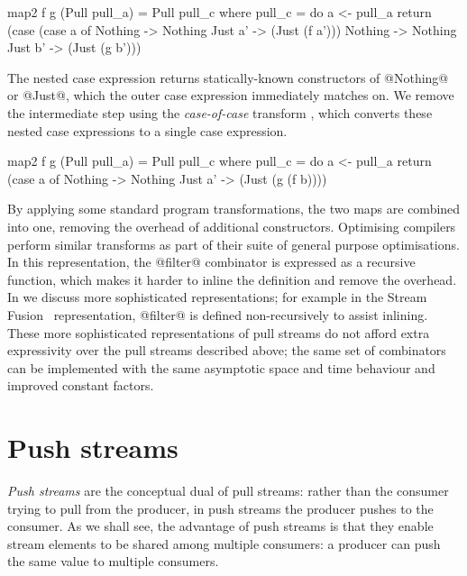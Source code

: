 \begin{haskell}
map2 f g (Pull pull_a) = Pull pull_c
 where
  pull_c = do
    a <- pull_a
    return (case (case a of
                   Nothing -> Nothing
                   Just a' -> (Just (f a')))
             Nothing -> Nothing
             Just b' -> (Just (g b')))
\end{haskell}

The nested case expression returns statically-known constructors of @Nothing@ or @Just@, which the outer case expression immediately matches on.
We remove the intermediate step using the \emph{case-of-case} transform \cite{jones1998transformation}, which converts these nested case expressions to a single case expression.


\begin{haskell}
map2 f g (Pull pull_a) = Pull pull_c
 where
  pull_c = do
    a <- pull_a
    return (case a of
             Nothing -> Nothing
             Just a' -> (Just (g (f b))))
\end{haskell}

By applying some standard program transformations, the two maps are combined into one, removing the overhead of additional constructors.
Optimising compilers perform similar transforms as part of their suite of general purpose optimisations.
In this representation, the @filter@ combinator is expressed as a recursive function, which makes it harder to inline the definition and remove the overhead.
In  we discuss more sophisticated representations; for example in the Stream Fusion~\cite{coutts2007stream} representation, @filter@ is defined non-recursively to assist inlining.
These more sophisticated representations of pull streams do not afford extra expressivity over the pull streams described above; the same set of combinators can be implemented with the same asymptotic space and time behaviour and improved constant factors.



\section{Push streams}
\label{taxonomy/push}

\emph{Push streams} are the conceptual dual of pull streams: rather than the consumer trying to pull from the producer, in push streams the producer pushes to the consumer.
As we shall see, the advantage of push streams is that they enable stream elements to be shared among multiple consumers: a producer can push the same value to multiple consumers.

